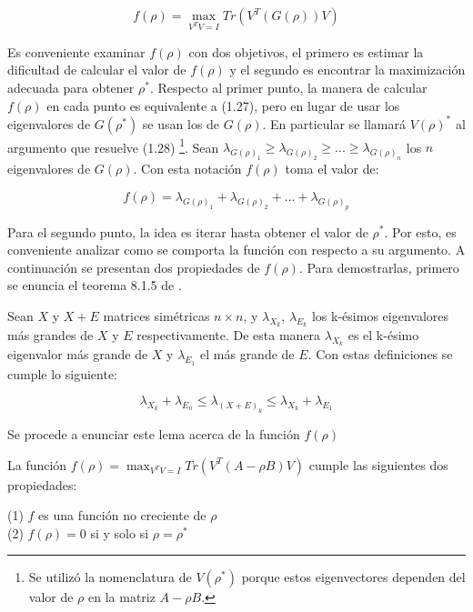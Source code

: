 \begin{equation}  \label{eq:2.29}
	f(\rho) = \max_{V^T V = I} Tr(V^T (G(\rho)) V)
\end{equation}

Es conveniente examinar $f(\rho)$ con dos objetivos, el primero es estimar la dificultad de calcular el valor de $f(\rho)$ y el segundo es encontrar la maximización adecuada para obtener $\rho^*$. Respecto al primer punto, la manera de calcular $f(\rho)$ en cada punto es equivalente a (1.27), pero en lugar de usar los eigenvalores de $G(\rho^*)$ se usan los de $G(\rho)$. En particular se llamará $V(\rho)^*$ al argumento que resuelve (1.28) \footnote{Se utilizó la nomenclatura de $V(\rho^*)$ porque estos eigenvectores dependen del valor de $\rho$ en la matriz $A - \rho B$.}. Sean $\lambda_{G(\rho)_1} \geq \lambda_{G(\rho)_2} \geq ... \geq \lambda_{G(\rho)_n}$ los $n$ eigenvalores de $G(\rho)$. Con esta notación $f(\rho)$ toma el valor de:


\begin{equation}\label{eq:2.30}
f(\rho) = \lambda_{G(\rho)_1} + \lambda_{G(\rho)_2} + ... +\lambda_{G(\rho)_p}
\end{equation}


Para el segundo punto, la idea es iterar hasta obtener el valor de $\rho^*$. Por esto, es conveniente analizar como se comporta la función con respecto a su argumento. A continuación se presentan dos propiedades de $f(\rho)$. Para demostrarlas, primero se enuncia el teorema 8.1.5 de \cite{golub2012matrix}.

\begin{theorem} \label{teorem.1}
	
	Sean $X$ y $X+E$ matrices simétricas $n \times n$, y $\lambda_{X_k}$, $\lambda_{E_k}$ los k-ésimos eigenvalores más grandes de $X$ y $E$ respectivamente. De esta manera $\lambda_{X_k}$ es el k-ésimo eigenvalor más grande de $X$ y $\lambda_{E_1}$ el más grande de $E$. Con estas definiciones se cumple lo siguiente:

	\begin{equation}\label{eq:2.31}
		\lambda_{X_k} +\lambda_{E_n} \leq \lambda_{(X+E)_k} \leq \lambda_{X_k} +\lambda_{E_1}
	\end{equation}

\end{theorem}

Se procede a enunciar este lema acerca de la función $f(\rho)$

\begin{lemma}\label{lemma2.6}
La función $f(\rho) = \max_{V^T V = I} Tr(V^T (A - \rho B) V)$ cumple las siguientes dos propiedades: 

(1) $f$ es una función no creciente de $\rho$ \\
(2) $f(\rho)= 0$  si y solo si $\rho = \rho^*$
\end{lemma}

